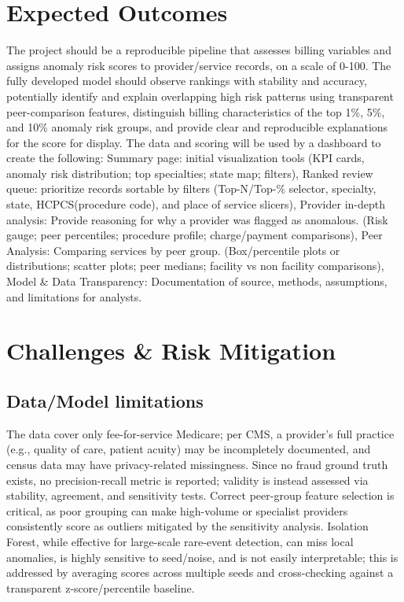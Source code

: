 \documentclass[12pt]{article}
\begin{document}
\section{Expected Outcomes}
The project should be a reproducible pipeline that assesses billing variables and assigns anomaly risk scores to provider/service records, on a scale of 0-100. The fully developed model should
observe rankings with stability and accuracy, potentially identify and explain overlapping high risk patterns using transparent peer-comparison features, distinguish billing characteristics of the top 1\%, 5\%, and 10\% anomaly risk groups, and provide clear and reproducible explanations for the score for display.
The data and scoring will be used by a dashboard to create the following: Summary page: initial visualization tools (KPI cards, anomaly risk distribution; top specialties; state map; filters), Ranked review queue: prioritize records sortable by filters (Top-N/Top-\% selector, specialty, state, HCPCS(procedure code), and place of service slicers), Provider in-depth analysis: Provide reasoning for why a provider was flagged as anomalous. (Risk gauge; peer percentiles; procedure profile; charge/payment comparisons), Peer Analysis: Comparing services by peer group. (Box/percentile plots or distributions; scatter plots; peer medians; facility vs non facility comparisons), Model \& Data Transparency: Documentation of source, methods, assumptions, and limitations for analysts.

\section{Challenges \& Risk Mitigation}
\subsection*{Data/Model limitations}
The data cover only fee-for-service Medicare; per CMS, a provider's full practice (e.g., quality of care, patient acuity) may be incompletely documented, and census data may have privacy-related missingness. Since no fraud ground truth exists, no precision-recall metric is reported; validity is instead assessed via stability, agreement, and sensitivity tests. Correct peer-group feature selection is critical, as poor grouping can make high-volume or specialist providers consistently score as outliers mitigated by the sensitivity analysis. Isolation Forest, while effective for large-scale rare-event detection, can miss local anomalies, is highly sensitive to seed/noise, and is not easily interpretable; this is addressed by averaging scores across multiple seeds and cross-checking against a transparent z-score/percentile baseline.
\end{document}
